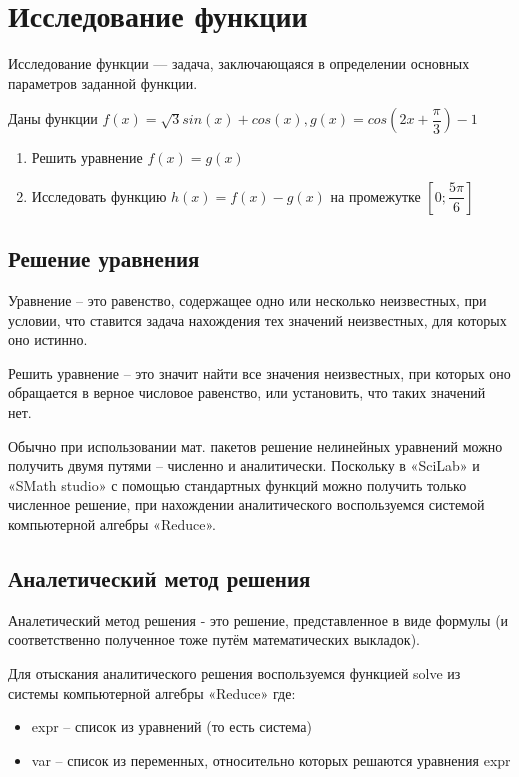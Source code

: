 \documentclass[russian,utf8,nocolumnxxxi,nocolumnxxxii]{eskdtext}
\begin{document}
\newpage

\section{Исследование функции}

Исследование функции — задача, заключающаяся в определении основных параметров заданной функции.

Даны функции $f(x)=\sqrt{3}sin(x)+cos(x),g(x)=cos(2x+\dfrac{\pi}{3})-1$
\begin{enumerate}
\item Решить уравнение $f(x)=g(x)$
\item Исследовать функцию $h(x)=f(x)-g(x)$ на промежутке $[0;\dfrac{5\pi}{6}]$
\end{enumerate}

\subsection{Решение уравнения}

Уравнение – это равенство, содержащее одно или несколько неизвестных, при условии, что ставится задача нахождения тех значений неизвестных, для которых оно истинно.

Решить уравнение – это значит найти все значения неизвестных, при которых оно обращается в верное числовое равенство, или установить, что таких значений нет.

Обычно при использовании мат. пакетов решение нелинейных уравнений можно получить двумя путями – численно и аналитически. Поскольку в «SciLab» и «SMath studio»  с помощью стандартных функций можно получить только численное решение, при нахождении аналитического воспользуемся системой компьютерной алгебры «Reduce».

\subsection{Аналетический метод решения}

Аналетический метод решения - это решение, представленное в виде формулы (и соответственно полученное тоже путём математических выкладок).

Для отыскания аналитического решения воспользуемся функцией solve из системы компьютерной алгебры «Reduce» где:
\begin{itemize}
 \item expr – список из уравнений (то есть система)
 \item var – список из переменных, относительно которых решаются уравнения expr
\end{itemize}
\end{document}
